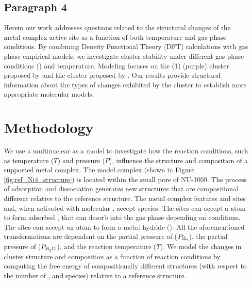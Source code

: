 \documentclass[journal=jctcce,manuscript=article]{achemso}
\begin{document}
\subsection{Paragraph 4}
Herein our work addresses questions related to the structural changes of the metal complex active site as a function of both temperature and gas phase conditions. By combining Density Functional Theory (DFT) calculations with gas phase empirical models, we investigate cluster stability under different gas phase conditions () and temperature. Modeling focuses on the (1)  (purple) cluster proposed by \citeauthor{PlateroPrats2017} and the  cluster proposed by \cite{Ikuno2017}. Our results provide structural information about the types of changes exhibited by the cluster to establish more appropriate molecular models. 



\newpage

\section{Methodology}
We use a multinuclear  as a model to investigate how the reaction conditions, such as temperature ($T$) and pressure ($P$), influence the structure and composition of a supported metal complex. The model  complex (shown in Figure \ref{fig:ref_Ni4_structure}) is located within the small pore of NU-1000. The process of  adsorption and dissociation generates new structures that are compositional different relative to the reference structure. The metal complex features  and  sites and, when activated with molecular , accept  species. The  sites can accept a  atom to form adsorbed , that can desorb into the gas phase depending on conditions. The  sites can accept an  atom to form a metal hydride (). All the aforementioned transformations are dependent on the partial pressure of  ($P_{\text{\ce{H2}}}$), the partial pressure of  ($P_{\text{\ce{H2O}}}$), and the reaction temperature ($T$). We model the changes in cluster structure and composition as a function of reaction conditions by computing the free energy of compositionally different structures (with respect to the number of ,  and  species) relative to a reference structure. 
\end{document}
